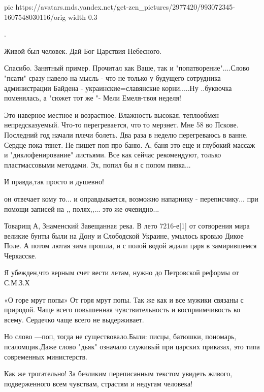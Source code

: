 \begin{itemize}
\ifcmt
pic https://avatars.mds.yandex.net/get-zen_pictures/2977420/993072345-1607548030116/orig
width 0.3
\fi

.

Живой был человек. Дай Бог Царствия Небесного.


Спасибо. Занятный пример. Прочитал как Ваше, так и "попатворение"....Слово
"псати" сразу навело на мысль - что не только у будущего сотрудника
администрации Байдена - украинские=славянские корни.....Ну ..буквочка
поменялась, а "сюжет тот же "- Мели Емеля-твоя неделя!


Это наверное местное и возрастное. Влажность высокая, теплообмен
непредсказуемый. Что-то перегревается, что то мерзнет. Мне 58 во Пскове.
Последний год начали плечи болеть. Два раза в неделю перегреваюсь в ванне.
Сердце пока тянет. Не пишет поп про баню. А, баня это еще и глубокий массаж и
"диклофенирование" листьями. Все как сейчас рекомендуют, только пластмассовыми
методами. Эх, попил бы я с попом пивка...


И правда,так просто и душевно!


он отвечает кому то... и оправдывается, возможно напарнику - переписчику... при
помощи записей на ,, полях,,... это же очевидно...


Товарищ А, Знаменский Завещанная река. В лето 7216-е[1] от сотворения мира
великие бунты были на Дону и Слободской Украине, умылось кровью Дикое Поле. А
потом лютая зима прошла, и с полой водой ждали царя в замирившемся Черкасске.

Я убежден,что верным счет вести летам, нужно до Петровской реформы от С.М.З.Х


«О горе мрут попы» От горя мрут попы. Так же как и все мужики связаны с
природой. Чаще всего повышенная чувствительность и восприимчивость ко всему.
Сердечко чаще всего не выдерживает.


Но слово —поп, тогда не существовало.Были: писцы, батюшки, пономарь,
псаломщик.Даже слово "дьяк" означало служивый при царских приказах, это типа
современных министерств.


Как же трогательно! За безликим переписанным текстом увидеть живого,
подверженного всем чувствам, страстям и недугам человека!
\end{itemize}
